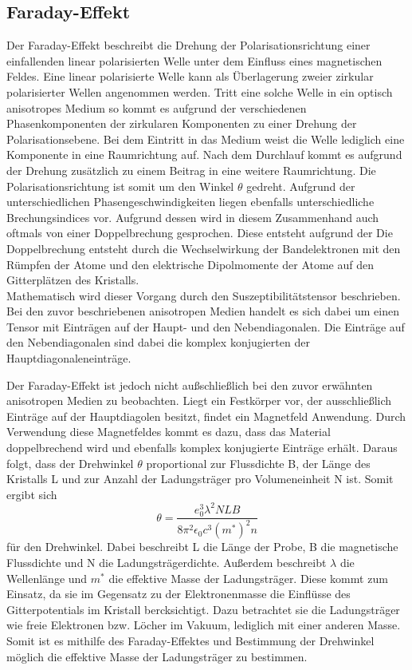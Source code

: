 \subsection{Faraday-Effekt}
Der Faraday-Effekt beschreibt die Drehung der Polarisationsrichtung einer einfallenden linear 
polarisierten Welle unter dem Einfluss eines magnetischen Feldes. Eine linear polarisierte Welle 
kann als Überlagerung zweier zirkular polarisierter Wellen angenommen werden. Tritt eine solche Welle in 
ein optisch anisotropes Medium so kommt es aufgrund der verschiedenen Phasenkomponenten der zirkularen
Komponenten zu einer Drehung der Polarisationsebene. Bei dem Eintritt in das Medium weist die Welle 
lediglich eine Komponente in eine Raumrichtung auf. Nach dem Durchlauf kommt es aufgrund der Drehung 
zusätzlich zu einem Beitrag in eine weitere Raumrichtung. Die Polarisationsrichtung ist somit um den 
Winkel $\theta$ gedreht. Aufgrund der unterschiedlichen Phasengeschwindigkeiten liegen ebenfalls 
unterschiedliche Brechungsindices vor. Aufgrund dessen wird in diesem Zusammenhand auch oftmals von einer 
Doppelbrechung gesprochen. Diese entsteht aufgrund der Die Doppelbrechung entsteht 
durch die Wechselwirkung der Bandelektronen mit den Rümpfen der Atome und 
den elektrische Dipolmomente der Atome auf den Gitterplätzen des Kristalls. \\
Mathematisch wird dieser Vorgang durch den Suszeptibilitätstensor beschrieben. Bei den zuvor beschriebenen 
anisotropen Medien handelt es sich dabei um einen Tensor mit Einträgen auf der Haupt- und den Nebendiagonalen. 
Die Einträge auf den Nebendiagonalen sind dabei die komplex konjugierten der Hauptdiagonaleneinträge. \\
\par 
Der Faraday-Effekt ist jedoch nicht außschließlich bei den zuvor erwähnten anisotropen Medien zu beobachten. 
Liegt ein Festkörper vor, der ausschließlich Einträge auf der Hauptdiagolen besitzt, findet ein 
Magnetfeld Anwendung. Durch Verwendung diese Magnetfeldes kommt es dazu, dass das Material doppelbrechend wird 
und ebenfalls komplex konjugierte Einträge erhält. Daraus folgt, dass der Drehwinkel $\theta$ 
proportional zur Flussdichte B, der Länge des Kristalls L und zur Anzahl der Ladungsträger pro Volumeneinheit N
ist. Somit ergibt sich 
\begin{equation}
    \theta = \frac{e_0^3 \lambda ^2 N L B}{8 \pi^2 \epsilon_0 c^3 (m^*)^2 n}
    \label{eqn:effmass}
\end{equation} \noindent
für den Drehwinkel. Dabei beschreibt L die Länge der Probe, B die magnetische Flussdichte und N die 
Ladungsträgerdichte. Außerdem beschreibt $\lambda$ die Wellenlänge und $m^*$ die effektive Masse der
Ladungsträger. Diese kommt zum Einsatz, da sie im Gegensatz zu der Elektronenmasse die Einflüsse des 
Gitterpotentials im Kristall bercksichtigt. Dazu betrachtet sie die Ladungsträger wie freie Elektronen bzw. 
Löcher im Vakuum, lediglich mit einer anderen Masse. Somit ist es mithilfe des Faraday-Effektes und Bestimmung
der Drehwinkel möglich die effektive Masse der Ladungsträger zu bestimmen.